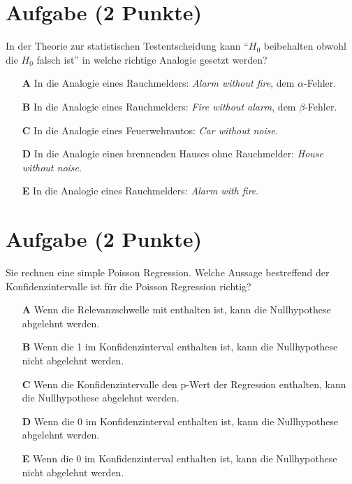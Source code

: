 \documentclass[a4paper, 10pt]{scrartcl}\usepackage[]{graphicx}\usepackage[]{xcolor}
\begin{document}
\section{Aufgabe \hfill (2 Punkte)}



In der Theorie zur statistischen Testentscheidung kann "`$H_0$ beibehalten obwohl die $H_0$ falsch ist"'
in welche richtige Analogie gesetzt werden?



\begin{enumerate}
\item [\textbf{A} \msquare] In die Analogie eines Rauchmelders: \textit{Alarm without fire}, dem $\alpha$-Fehler.
\item [\textbf{B} \msquare] In die Analogie eines Rauchmelders: \textit{Fire without alarm}, dem $\beta$-Fehler.
\item [\textbf{C} \msquare] In die Analogie eines Feuerwehrautos: \textit{Car without noise}.
\item [\textbf{D} \msquare] In die Analogie eines brennenden Hauses ohne Rauchmelder: \textit{House without noise}.
\item [\textbf{E} \msquare] In die Analogie eines Rauchmelders: \textit{Alarm with fire}.
\end{enumerate}

\section{Aufgabe \hfill (2 Punkte)}



Sie rechnen eine simple Poisson Regression. Welche Aussage bestreffend der
Konfidenzintervalle ist f{\"u}r die Poisson Regression richtig?



\begin{enumerate}
\item [\textbf{A} \msquare] Wenn die Relevanzschwelle mit enthalten ist, kann die Nullhypothese abgelehnt werden.
\item [\textbf{B} \msquare] Wenn die 1 im Konfidenzinterval enthalten ist, kann die Nullhypothese nicht abgelehnt werden.
\item [\textbf{C} \msquare] Wenn die Konfidenzintervalle den p-Wert der Regression enthalten, kann die Nullhypothese abgelehnt werden.
\item [\textbf{D} \msquare] Wenn die 0 im Konfidenzinterval enthalten ist, kann die Nullhypothese abgelehnt werden.
\item [\textbf{E} \msquare] Wenn die 0 im Konfidenzinterval enthalten ist, kann die Nullhypothese nicht abgelehnt werden.
\end{enumerate}
\end{document}
